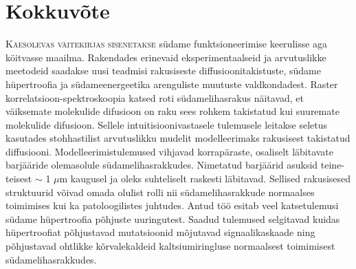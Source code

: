 \chapter*{Kokkuv\~ote}
\lettrine[lines=2, lhang=0.33, loversize=0.25]{K}{\"aesolevas v\"aitekirjas
sisenetakse} südame funktsioneerimise kee\-ru\-lis\-se aga köit\-vasse
maailma. Raken\-dades eri\-ne\-vaid eks\-peri\-men\-taal\-seid ja
arvu\-tus\-likke meeto\-deid saa\-dakse uusi teadmisi rakusiseste
diffusioonitakistuste, südame hüpertroofia ja südameenergeetika
arenguliste muutuste valdkondadest. Raster
korre\-lat\-sioon-spektroskoopia katsed roti südamelihasrakus näitavad,
et väiksemate molekulide difusioon on raku sees rohkem takistatud kui
suuremate molekulide difusioon. Sellele intuitisioonivastasele
tulemusele  leitakse seletus kasutades stoh\-hastilist arvutuslikku
mudelit modelleerimaks rakusisest takistatud diffusiooni.
Modelleerimistulemused vihjavad korrapäraste, osaliselt läbitavate
barjääride ole\-ma\-so\-lu\-le südamelihasrakkudes. Nimetatud barjäärid
asuksid teine-teisest $\sim$ 1 $\mu$m kaugusel ja oleks suhteliselt
raskesti lä\-bi\-tavad. Sellised rakusisesed struktuurid või\-vad omada
olulist rolli nii süda\-me\-li\-has\-rakkude normaalses toimimises kui
ka patoloogilistes juhtudes. Antud töö esitab veel katse\-tulemusi
südame hüper\-troofia põh\-juste uuringutest. Saadud tulemused
selgitavad kuidas hüper\-troofiat põh\-justavad mutat\-sioonid
mõ\-ju\-ta\-vad signaali\-kaskaade ning põh\-jus\-tavad ohtlikke
kõrva\-le\-kal\-deid kaltsium\-iringluse nor\-maal\-sest toi\-mi\-mi\-sest
sü\-da\-me\-lihas\-rakku\-des.


\[\]

